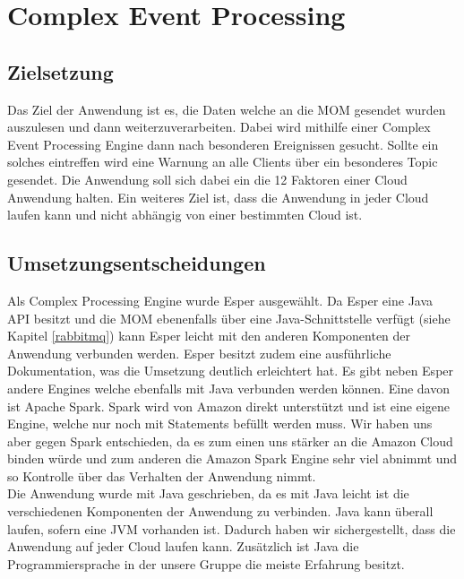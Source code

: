 \section{Complex Event Processing}\label{cep}


\subsection{Zielsetzung}
Das Ziel der Anwendung ist es, die Daten welche an die MOM gesendet wurden auszulesen und dann weiterzuverarbeiten. Dabei wird mithilfe einer Complex Event Processing Engine dann nach besonderen Ereignissen gesucht. Sollte ein solches eintreffen wird eine Warnung an alle Clients über ein besonderes Topic gesendet. Die Anwendung soll sich dabei ein die 12 Faktoren einer Cloud Anwendung halten. Ein weiteres Ziel ist, dass die Anwendung in jeder Cloud laufen kann und nicht abhängig von einer bestimmten Cloud ist. 

\subsection{Umsetzungsentscheidungen}
Als Complex Processing Engine wurde Esper ausgewählt. Da Esper eine Java API besitzt und die MOM ebenenfalls über eine Java-Schnittstelle verfügt (siehe Kapitel \ref{rabbitmq}) kann Esper leicht mit den anderen Komponenten der Anwendung verbunden werden. Esper besitzt zudem eine ausführliche Dokumentation, was die Umsetzung deutlich erleichtert hat. Es gibt neben Esper andere Engines welche ebenfalls mit Java verbunden werden können. Eine davon ist Apache Spark. Spark wird von Amazon direkt unterstützt und ist eine eigene Engine, welche nur noch mit Statements befüllt werden muss. Wir haben uns aber gegen Spark entschieden, da es zum einen uns stärker an die Amazon Cloud binden würde und zum anderen die Amazon Spark Engine sehr viel abnimmt und so Kontrolle über das Verhalten der Anwendung nimmt. 
\\
Die Anwendung wurde mit Java geschrieben, da es mit Java leicht ist die verschiedenen Komponenten der Anwendung zu verbinden. Java kann überall laufen, sofern eine JVM vorhanden ist. Dadurch haben wir sichergestellt, dass die Anwendung auf jeder Cloud laufen kann. Zusätzlich ist Java die Programmiersprache in der unsere Gruppe die meiste Erfahrung besitzt.   

